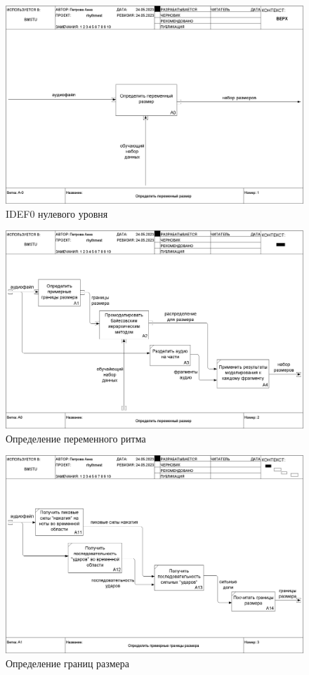 \begin{figure}[h]
	\centering
	\includegraphics[scale=0.3]{inc/img/rhythm_idef/01_A-0.png}
	\caption{IDEF0 нулевого уровня}
	\label{img:rhythm_0}
\end{figure}

\begin{figure}[h]
	\centering
	\includegraphics[scale=0.25]{inc/img/rhythm_idef/02_A0.png}
	\caption{Определение переменного ритма}
	\label{img:rhythm_1}
\end{figure}

\begin{figure}[h]
	\centering
	\includegraphics[scale=0.25]{inc/img/rhythm_idef/03_A1.png}
	\caption{Определение границ размера}
	\label{img:rhythm_2}
\end{figure}

